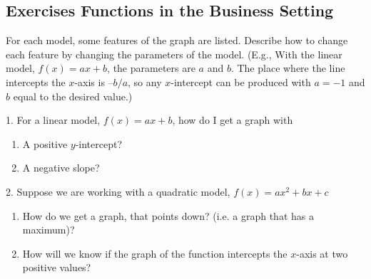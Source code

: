 \documentclass[10pt,]{book}
\theoremstyle{plain}
\theoremstyle{definition}
\theoremstyle{definition}
\begin{document}
\subsection[{Exercises  Functions in the Business Setting}]{Exercises  Functions in the Business Setting}\label{exercises-set-sec-1-2}
For each model, some features of the graph are listed.  Describe how to change each feature by changing the parameters of the model.  (E.g., With the linear model, 
\(f(x)=a x+b\), the parameters are \(a\) and \(b\).  The place where the line intercepts the 
\(x\)-axis is \(–b/a\), so any \(x\)-intercept can be produced with \(a=-1\) and \(b\) equal to the desired value.)%
\begin{exerciselist}
\item[1.]\hypertarget{exercise-21}{} For a linear model, \(f(x)=a x+b\), how do I get a graph with 
\leavevmode%
\begin{enumerate}[label=(\alph*)]
\item\hypertarget{li-51}{}A positive \(y\)-intercept?%
\item\hypertarget{li-52}{}A negative slope?%
\end{enumerate}

%
\par\smallskip
\item[2.]\hypertarget{exercise-22}{} Suppose we are working with a quadratic model, \(f(x)=a x^2+b x+c\)
\leavevmode%
\begin{enumerate}[label=(\alph*)]
\item\hypertarget{li-53}{}How do we get a graph, that points down? (i.e. a graph that has a maximum)?%
\item\hypertarget{li-54}{}How will we know if the graph of the function intercepts the \(x\)-axis at two positive values?%
\end{enumerate}


\end{exerciselist}
\end{document}
